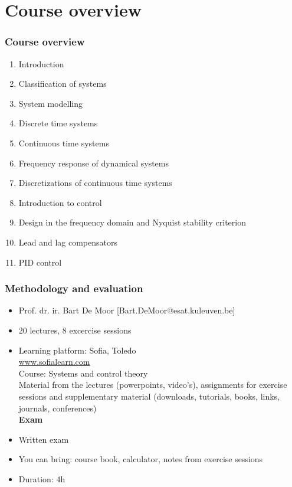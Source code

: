 \section{Course overview} 

\begin{frame}
	\frametitle{Course overview}
	\begin{enumerate}
		\item Introduction
		\item Classification of systems
		\item System modelling
		\item Discrete time systems
		\item Continuous time systems
		\item Frequency response of dynamical systems
		\item Discretizations of continuous time systems
		\item Introduction to control
		\item Design in the frequency domain and Nyquist stability criterion
		\item Lead and lag compensators
		\item PID control
	\end{enumerate}
\end{frame}

\begin{frame}
	\frametitle{Methodology and evaluation}
	\begin{itemize}
		\item Prof. dr. ir. Bart De Moor ‎[Bart.DeMoor@esat.kuleuven.be]‎
		\item 20 lectures, 8 excercise sessions\\
		\item Learning platform: Sofia, Toledo\\
		\url{www.sofialearn.com}\\
		Course: Systems and control theory\\
		Material from the lectures (powerpoints, video's), assignments for exercise sessions and supplementary material (downloads, tutorials, books, links, journals, conferences)\\
		\bigskip
		\textbf{Exam}
		\item Written exam
		\item You can bring: course book, calculator, notes from exercise sessions
		\item Duration: 4h
	\end{itemize}
\end{frame}

